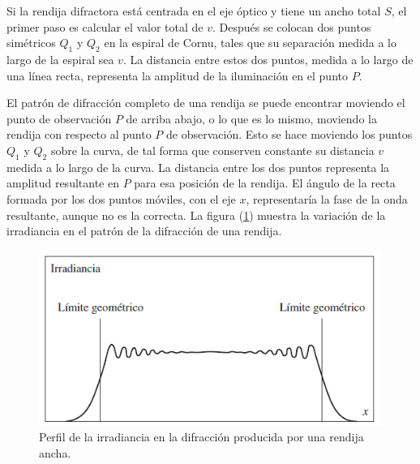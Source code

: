 \documentclass[14pt]{extarticle}
\begin{document}
Si la rendija difractora está centrada en el eje óptico y tiene un ancho total $S$, el primer paso es calcular el valor total de $v$. Después se colocan dos puntos simétricos $Q_{1}$ y $Q_{2}$ en la espiral de Cornu, tales que su separación medida a lo largo de la espiral sea $v$. La distancia entre estos dos puntos, medida a lo largo de una línea recta, representa la amplitud de la iluminación en el punto $P$.
\par
El patrón de difracción completo de una rendija se puede encontrar moviendo el punto de observación $P$ de arriba abajo, o lo que es lo mismo, moviendo la rendija con respecto al punto $P$ de observación. Esto se hace moviendo los puntos $Q_{1}$ y $Q_{2}$ sobre la curva, de tal forma que conserven constante su distancia $v$ medida a lo largo de la curva. La distancia entre los dos puntos representa la amplitud resultante en $P$ para esa posición de la rendija. El ángulo de la recta formada por los dos puntos móviles, con el eje $x$, representaría la fase de la onda resultante, aunque no es la correcta. La figura (\ref{fig:figura_X_08}) muestra la variación de la irradiancia en el patrón de la difracción de una rendija.
\begin{figure}[H]
    \centering
    \includegraphics[scale=1]{Imagenes/Difraccion_08.png}
    \caption{Perfil de la irradiancia en la difracción producida por una rendija ancha.}
    \label{fig:figura_X_08}
\end{figure}
\end{document}

